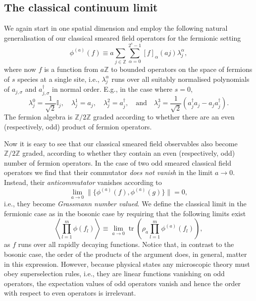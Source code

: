 \documentclass[prl,twocolumn,lengthcheck,superscriptaddress]{revtex4-1}
\newcommand{\tr}{\operatorname{tr}}
\theoremstyle{definition}
\theoremstyle{remark}
\begin{document}
\subsection{The classical continuum limit}
We again start in one spatial dimension and employ the following natural generalisation of our classical smeared field operators for the fermionic setting
\begin{equation}
	\phi^{(a)}(f) \equiv a\sum_{j\in\mathbb{Z}} \sum_{\alpha=0}^{2^s-1} [f]_\alpha(aj) \lambda_j^\alpha,
\end{equation}
where now $f$ is a function from $a\mathbb{Z}$ to bounded operators on the space of fermions of $s$ species at a single site, i.e., $\lambda^{\alpha}_j$ runs over all suitably normalised polynomials of $a_{j,\sigma}$ and $a_{j,\sigma}^\dag$ in normal order. E.g., in the case where $s=0$,
\begin{equation}
	\lambda^0_j = \frac{1}{\sqrt{2}}\mathbb{I}_j, \quad \lambda^{1}_j = a_j, \quad \lambda^{2}_j = a_j^\dag, \quad\text{and}\quad \lambda^{3}_j = \frac{1}{\sqrt{2}}(a_j^\dag a_j - a_j a_j^\dag).
\end{equation}
The fermion algebra is $\mathbb{Z}/2\mathbb{Z}$ graded according to whether there are an even (respectively, odd) product of fermion operators.

Now it is easy to see that our classical smeared field observables also become $\mathbb{Z}/2\mathbb{Z}$ graded, according to whether they contain an even (respectively, odd) number of fermion operators. In the case of two odd smeared classical field operators we find that their commutator \emph{does not vanish} in the limit $a\rightarrow 0$. Instead, their \emph{anticommutator} vanishes according to
\begin{equation}
	\lim_{a\rightarrow 0}\|\{\phi^{(a)}(f), \phi^{(a)}(g)\}\| = 0,
\end{equation}
i.e., they become \emph{Grassmann number valued}. We define the classical limit in the fermionic case as in the bosonic case by requiring that the following limits exist
\begin{equation}
	\left\langle\prod_{l=1}^m\phi(f_l)\right\rangle \equiv \lim_{a\rightarrow 0} \tr\left(\rho_a \prod_{l=1}^m\phi^{(a)}(f_l)\right),
\end{equation}
as $f$ runs over all rapidly decaying functions. Notice that, in contrast to the bosonic case, the order of the products of the argument does, in general, matter in this expression. However, because physical states any microscopic theory must obey superselection rules, i.e., they are linear functions vanishing on odd operators, the expectation values of odd operators vanish and hence the order with respect to even operators is irrelevant.
\end{document}
